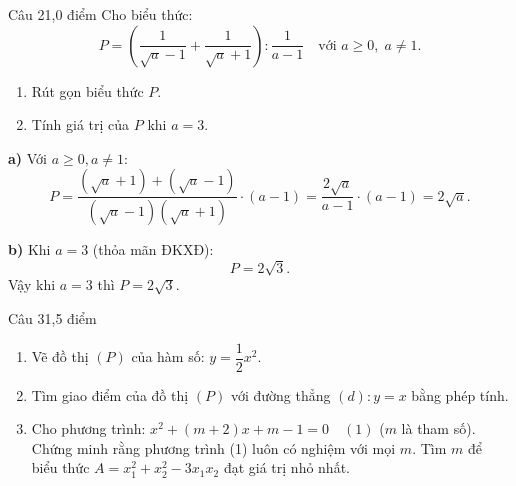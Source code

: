 \begin{de_cau}{Câu 2}{1,0 điểm}
Cho biểu thức:
\[P = \left(\dfrac{1}{\sqrt{a}-1} + \dfrac{1}{\sqrt{a}+1}\right) : \dfrac{1}{a-1} \quad \text{với } a \ge 0,\; a \neq 1.\]
\begin{enumerate}[label=\alph*)]
\item Rút gọn biểu thức $P$.
\item Tính giá trị của $P$ khi $a = 3$.
\end{enumerate}
\end{de_cau}

\begin{loi_giai_cau}
\textbf{a)} Với $a \ge 0, a \neq 1$:
\[P = \frac{(\sqrt{a}+1) + (\sqrt{a}-1)}{(\sqrt{a}-1)(\sqrt{a}+1)} \cdot (a-1) = \frac{2\sqrt{a}}{a-1} \cdot (a-1) = \boxed{2\sqrt{a}}.\]

\textbf{b)} Khi $a = 3$ (thỏa mãn ĐKXĐ):
\[P = 2\sqrt{3}.\]
Vậy khi $a = 3$ thì $\boxed{P = 2\sqrt{3}}$.
\end{loi_giai_cau}

\begin{de_cau}{Câu 3}{1,5 điểm}
\begin{enumerate}[label=\alph*)]
\item Vẽ đồ thị $(P)$ của hàm số: $y = \dfrac{1}{2}x^2$.
\item Tìm giao điểm của đồ thị $(P)$ với đường thẳng $(d)\colon y = x$ bằng phép tính.
\item Cho phương trình: $x^2 + (m+2)x + m - 1 = 0 \quad (1)$ ($m$ là tham số). Chứng minh rằng phương trình (1) luôn có nghiệm với mọi $m$. Tìm $m$ để biểu thức $A = x_1^2 + x_2^2 - 3x_1 x_2$ đạt giá trị nhỏ nhất.
\end{enumerate}
\end{de_cau}

